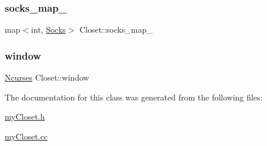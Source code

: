 \mbox{\label{classCloset_a33a48dfc5ef542261bb0dd373f899f9e}} 
\subsubsection{\texorpdfstring{socks\+\_\+map\+\_\+}{socks\_map\_}}
{\footnotesize\ttfamily map$<$int, \mbox{\hyperlink{classSocks}{Socks}}$>$ Closet\+::socks\+\_\+map\+\_\+\hspace{0.3cm}{\ttfamily [private]}}

\mbox{\label{classCloset_af1eb4f786cc4eccd3018b90632236a93}} 
\subsubsection{\texorpdfstring{window}{window}}
{\footnotesize\ttfamily \mbox{\hyperlink{classNcurses}{Ncurses}} Closet\+::window\hspace{0.3cm}{\ttfamily [private]}}



The documentation for this class was generated from the following files\+:\begin{DoxyCompactItemize}
\item 
\mbox{\hyperlink{myCloset_8h}{my\+Closet.\+h}}\item 
\mbox{\hyperlink{myCloset_8cc}{my\+Closet.\+cc}}\end{DoxyCompactItemize}
